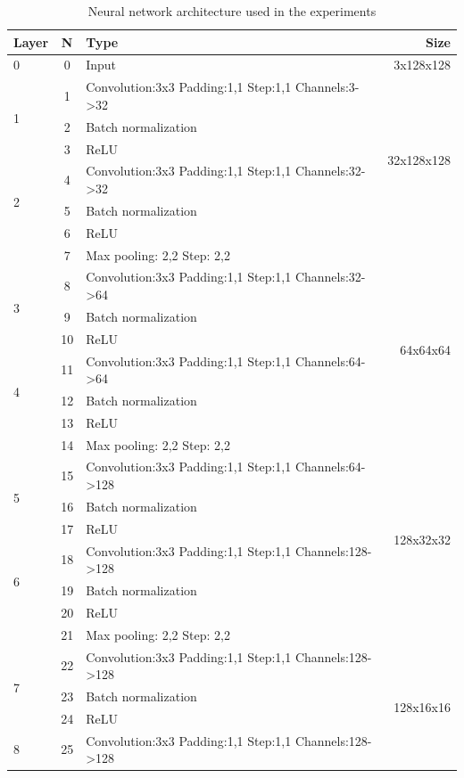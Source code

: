 \documentclass{IOS-Book-Article}
\begin{document}
\begin{table}[h!]
	\centering
	\caption{Neural network architecture used in the experiments}
	\label{tab:nn}
	\begin{tabular}{l|c|l|r}
		Layer & N & Type & Size \\
		\hline
		0 & 0 & Input & 3x128x128\\
		\hline
		\multirow{3}{*}{1} & 1 & Convolution:3x3 Padding:1,1 Step:1,1 Channels:3->32 & \multirow{6}{*}{32x128x128}\\
		& 2 & Batch normalization &\\
		& 3 & ReLU & \\\cline{1-3}
		\multirow{3}{*}{2} & 4 & Convolution:3x3 Padding:1,1 Step:1,1 Channels:32->32 &\\
		& 5 & Batch normalization &\\
		& 6 & ReLU & \\
		& 7 & Max pooling: 2,2 Step: 2,2\\
		\hline
		\multirow{3}{*}{3} & 8 & Convolution:3x3 Padding:1,1 Step:1,1 Channels:32->64 & \multirow{6}{*}{64x64x64}\\
		& 9 & Batch normalization &\\
		& 10 & ReLU & \\\cline{1-3}
		\multirow{3}{*}{4} & 11 & Convolution:3x3 Padding:1,1 Step:1,1 Channels:64->64 &\\
		& 12 & Batch normalization &\\
		& 13 & ReLU & \\
		& 14 & Max pooling: 2,2 Step: 2,2\\
		\hline		 
		\multirow{3}{*}{5} & 15 & Convolution:3x3 Padding:1,1 Step:1,1 Channels:64->128 & \multirow{6}{*}{128x32x32}\\
		& 16 & Batch normalization &\\
		& 17 & ReLU & \\\cline{1-3}
		\multirow{3}{*}{6} & 18 & Convolution:3x3 Padding:1,1 Step:1,1 Channels:128->128 &\\
		& 19 & Batch normalization &\\
		& 20 & ReLU & \\
		& 21 & Max pooling: 2,2 Step: 2,2\\
		\hline
		\multirow{3}{*}{7} & 22 & Convolution:3x3 Padding:1,1 Step:1,1 Channels:128->128 & \multirow{6}{*}{128x16x16}\\
		& 23 & Batch normalization &\\
		& 24 & ReLU & \\\cline{1-3}
		\multirow{3}{*}{8} & 25 & Convolution:3x3 Padding:1,1 Step:1,1 Channels:128->128 &\\

\end{tabular}
\end{table}
\end{document}
